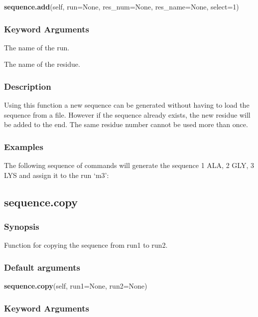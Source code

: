 \textsf{\textbf{sequence.add}(self, run=None, res\_num=None, res\_name=None, select=1)}


\subsubsection{Keyword Arguments}

  The name of the run.

  The name of the residue.


\subsubsection{Description}

Using this function a new sequence can be generated without having to load the sequence from
a file.  However if the sequence already exists, the new residue will be added to the end.
The same residue number cannot be used more than once.


\subsubsection{Examples}

The following sequence of commands will generate the sequence 1 ALA, 2 GLY, 3 LYS and assign
it to the run `m3':





\newpage

\subsection{sequence.copy}


\subsubsection{Synopsis}

Function for copying the sequence from run1 to run2.

\subsubsection{Default arguments}

\textsf{\textbf{sequence.copy}(self, run1=None, run2=None)}


\subsubsection{Keyword Arguments}

